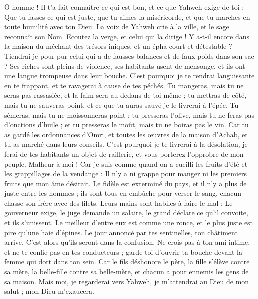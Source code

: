 \begin{multicols}{2}
Ô homme ! Il t'a fait connaître ce qui est bon, et ce que Yahweh exige de toi : Que tu fasses ce qui est juste, que tu aimes la miséricorde, et que tu marches en toute humilité avec ton Dieu.
La voix de Yahweh crie à la ville, et le sage reconnaît son Nom. Ecoutez la verge, et celui qui la dirige !
Y a-t-il encore dans la maison du méchant des trésors iniques, et un épha court et détestable ?
Tiendrai-je pour pur celui qui a de fausses balances et de faux poids dans son sac ?
Ses riches sont pleins de violence, ses habitants usent de mensonge, et ils ont une langue trompeuse dans leur bouche.
C'est pourquoi je te rendrai languissante en te frappant, et te ravagerai à cause de tes péchés.
Tu mangeras, mais tu ne seras pas rassasiée, et la faim sera au-dedans de toi-même ; tu mettras de côté, mais tu ne sauveras point, et ce que tu auras sauvé je le livrerai à l'épée.
Tu sèmeras, mais tu ne moissonneras point ; tu presseras l'olive, mais tu ne feras pas d'onctions d'huile ; et tu presseras le moût, mais tu ne boiras pas le vin.
Car tu as gardé les ordonnances d'Omri, et toutes les œuvres de la maison d'Achab, et tu as marché dans leurs conseils. C'est pourquoi je te livrerai à la désolation, je ferai de tes habitants un objet de raillerie, et vous porterez l'opprobre de mon peuple.
\VerseOne{}Malheur à moi ! Car je suis comme quand on a cueilli les fruits d'été et les grappillages de la vendange : Il n'y a ni grappe pour manger ni les premiers fruits que mon âme désirait.
Le fidèle est exterminé du pays, et il n'y a plus de juste entre les hommes ; ils sont tous en embûche pour verser le sang, chacun chasse son frère avec des filets.
Leurs mains sont habiles à faire le mal : Le gouverneur exige, le juge demande un salaire, le grand déclare ce qu'il convoite, et ils s'unissent.
Le meilleur d'entre eux est comme une ronce, et le plus juste est pire qu'une haie d'épines. Le jour annoncé par tes sentinelles, ton châtiment arrive. C'est alors qu'ils seront dans la confusion.
Ne crois pas à ton ami intime, et ne te confie pas en tes conducteurs ; garde-toi d'ouvrir ta bouche devant la femme qui dort dans ton sein.
Car le fils déshonore le père, la fille s'élève contre sa mère, la belle-fille contre sa belle-mère, et chacun a pour ennemis les gens de sa maison.
Mais moi, je regarderai vers Yahweh, je m'attendrai au Dieu de mon salut ; mon Dieu m'exaucera.

\end{multicols}

